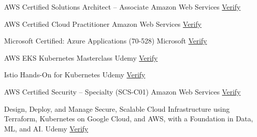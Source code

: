 
\begin{cvhonors}

  \cvhonor
    {AWS Certified Solutions Architect – Associate} %
    {Amazon Web Services} %
    {\href{https://www.credly.com/badges/0194fde7-f511-4761-8795-7150e783d14c?source=linked_in_profile}{\faCertificate\space Verify}} %
    {} %

  \cvhonor
    {AWS Certified Cloud Practitioner} %
    {Amazon Web Services} %
    {\href{https://www.credly.com/badges/8528ef32-7f12-4b28-9f4f-d22e4bbabdb6/linked_in_profile}{\faCertificate\space Verify}} %
    {} %

  \cvhonor
    {Microsoft Certified: Azure Applications (70-528)} %
    {Microsoft} %
    {\href{https://learn.microsoft.com/en-us/users/shubhenduganguly-1178/transcript/dq6n1i5zyk443j1}{\faCertificate\space Verify}} %
    {} %

  \cvhonor
    {AWS EKS Kubernetes Masterclass} %
    {Udemy} %
    {\href{https://www.udemy.com/certificate/UC-21b76729-85e4-44e4-9d4e-8fab25604d7e/}{\faCertificate\space Verify}} %
    {} %

  \cvhonor
    {Istio Hands-On for Kubernetes} %
    {Udemy} %
    {\href{https://www.udemy.com/certificate/UC-31b9d7ab-89d8-41d6-95b9-b045544cff46/}{\faCertificate\space Verify}} %
    {} %

  \cvhonor
    {AWS Certified Security – Specialty (SCS-C01)} %
    {Amazon Web Services} %
    {\href{https://www.udemy.com/certificate/UC-21b76729-85e4-44e4-9d4e-8fab25604d7e/}{\faCertificate\space Verify}} %
    {} %

  \cvhonor
    {Design, Deploy, and Manage Secure, Scalable Cloud Infrastructure using Terraform, Kubernetes on Google Cloud, and AWS, with a Foundation in Data, ML, and AI.} %
    {Udemy} %
    {\href{https://www.cloudskillsboost.google/public_profiles/6da45ab0-077b-43ed-adca-b7727f022c4b}{\faCertificate\space Verify}} %
    {}\\ %

\end{cvhonors}

